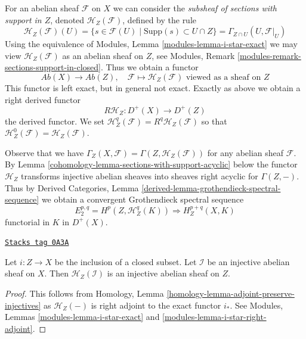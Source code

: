 \medskip\noindent
For an abelian sheaf $\mathcal{F}$ on $X$ we can consider the
{\it subsheaf of sections with support in $Z$}, denoted
$\mathcal{H}_Z(\mathcal{F})$, defined by the rule
$$
\mathcal{H}_Z(\mathcal{F})(U) =
\{s \in \mathcal{F}(U) \mid \text{Supp}(s) \subset U \cap Z\} =
\Gamma_{Z \cap U}(U, \mathcal{F}|_U)
$$
Using the equivalence of Modules, Lemma \ref{modules-lemma-i-star-exact}
we may view $\mathcal{H}_Z(\mathcal{F})$ as an abelian sheaf on $Z$, see
Modules, Remark \ref{modules-remark-sections-support-in-closed}.
Thus we obtain a functor
$$
\textit{Ab}(X) \longrightarrow \textit{Ab}(Z),\quad
\mathcal{F} \longmapsto
\mathcal{H}_Z(\mathcal{F})\text{ viewed as a sheaf on }Z
$$
This functor is left exact, but in general not exact. Exactly as above
we obtain a right derived functor
$$
R\mathcal{H}_Z : D^+(X) \longrightarrow D^+(Z)
$$
the derived functor. We set
$\mathcal{H}^q_Z(\mathcal{F}) = R^q\mathcal{H}_Z(\mathcal{F})$ so that
$\mathcal{H}^0_Z(\mathcal{F}) = \mathcal{H}_Z(\mathcal{F})$.

\medskip\noindent
Observe that we have
$\Gamma_Z(X, \mathcal{F}) = \Gamma(Z, \mathcal{H}_Z(\mathcal{F}))$
for any abelian sheaf $\mathcal{F}$. By
Lemma \ref{cohomology-lemma-sections-with-support-acyclic} below
the functor $\mathcal{H}_Z$ transforms injective abelian sheaves
into sheaves right acyclic for $\Gamma(Z, -)$. Thus by
Derived Categories, Lemma \ref{derived-lemma-grothendieck-spectral-sequence}
we obtain a convergent Grothendieck spectral sequence
$$
E_2^{p, q} = H^p(Z, \mathcal{H}^q_Z(K)) \Rightarrow H^{p + q}_Z(X, K)
$$
functorial in $K$ in $D^+(X)$.

\begin{lemma}
\label{cohomology-lemma-sections-with-support-acyclic}
\href{https://stacks.math.columbia.edu/tag/0A3A}{\texttt{Stacks tag 0A3A}}

Let $i : Z \to X$ be the inclusion of a closed subset.
Let $\mathcal{I}$ be an injective abelian sheaf on $X$.
Then $\mathcal{H}_Z(\mathcal{I})$ is an injective abelian sheaf on $Z$.
\end{lemma}

\begin{proof}
This follows from
Homology, Lemma \ref{homology-lemma-adjoint-preserve-injectives}
as $\mathcal{H}_Z(-)$ is right adjoint to the exact functor $i_*$.
See Modules, Lemmas \ref{modules-lemma-i-star-exact} and
\ref{modules-lemma-i-star-right-adjoint}.
\end{proof}

